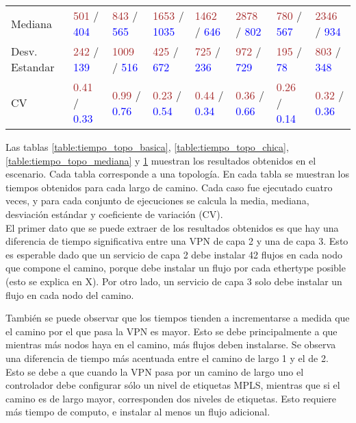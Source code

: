 \begin{table}[!h]
\begin{tabular}{p{2.2cm} p{1.4cm} p{1.4cm} p{1.4cm} p{1.4cm} p{1.4cm} p{1.4cm} p{1.4cm}}
		Mediana & \textcolor{brown}{501} / \textcolor{blue}{404} & \textcolor{brown}{843} / \textcolor{blue}{565} & \textcolor{brown}{1653} / \textcolor{blue}{1035} & \textcolor{brown}{1462} / \textcolor{blue}{646} & \textcolor{brown}{2878} / \textcolor{blue}{802} & \textcolor{brown}{780} / \textcolor{blue}{567} & \textcolor{brown}{2346} / \textcolor{blue}{934} \\
		Desv. Estandar & \textcolor{brown}{242} / \textcolor{blue}{139} & \textcolor{brown}{1009} / \textcolor{blue}{516} & \textcolor{brown}{425} / \textcolor{blue}{672} & \textcolor{brown}{725} / \textcolor{blue}{236} & \textcolor{brown}{972} / \textcolor{blue}{729} & \textcolor{brown}{195} / \textcolor{blue}{78} & \textcolor{brown}{803} / \textcolor{blue}{348} \\
		CV & \textcolor{brown}{0.41} / \textcolor{blue}{0.33} & \textcolor{brown}{0.99} / \textcolor{blue}{0.76} & \textcolor{brown}{0.23} / \textcolor{blue}{0.54} & \textcolor{brown}{0.44} / \textcolor{blue}{0.34} & \textcolor{brown}{0.36} / \textcolor{blue}{0.66} & \textcolor{brown}{0.26} / \textcolor{blue}{0.14} & \textcolor{brown}{0.32} / \textcolor{blue}{0.36} \\ [1ex]
		\hline
	\end{tabular}
	\label{table:tiempo_topo_grande}
\end{table}


Las tablas \ref{table:tiempo_topo_basica}, \ref{table:tiempo_topo_chica}, \ref{table:tiempo_topo_mediana} y \ref{table:tiempo_topo_grande} muestran los resultados obtenidos en el escenario. Cada tabla corresponde a una topología. En cada tabla se muestran los tiempos obtenidos para cada largo de camino. Cada caso fue ejecutado cuatro veces, y para cada conjunto de ejecuciones se calcula la media, mediana, desviación estándar y coeficiente de variación (CV). \\

El primer dato que se puede extraer de los resultados obtenidos es que hay una diferencia de tiempo significativa entre una VPN de capa 2 y una de capa 3. Esto es esperable dado que un servicio de capa 2 debe instalar 42 flujos en cada nodo que compone el camino, porque debe instalar un flujo por cada ethertype posible (esto se explica en X). Por otro lado, un servicio de capa 3 solo debe instalar un flujo en cada nodo del camino.

También se puede observar que los tiempos tienden a incrementarse a medida que el camino por el que pasa la VPN es mayor. Esto se debe principalmente a que mientras más nodos haya en el camino, más flujos deben instalarse. Se observa una diferencia de tiempo más acentuada entre el camino de largo 1 y el de 2. Esto se debe a que cuando la VPN pasa por un camino de largo uno el controlador debe configurar sólo un nivel de etiquetas MPLS, mientras que si el camino es de largo mayor, corresponden dos niveles de etiquetas. Esto requiere más tiempo de computo, e instalar al menos un flujo adicional.

